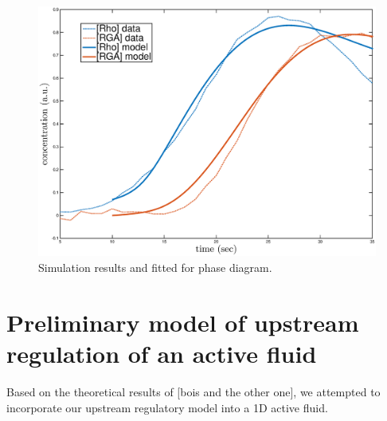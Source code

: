\begin{figure}[h!]
\centering
\includegraphics[width=\hsize]{pulse/model_profile.eps}
\caption{\label{fig:pulse_fit_phase}  Simulation results and fitted for phase diagram.}
\end{figure}


\section{Preliminary model of upstream regulation of an active fluid}
Based on the theoretical results of [bois and the other one], we attempted to incorporate our upstream regulatory model into a 1D active fluid.  


